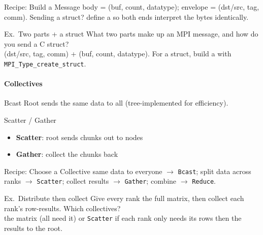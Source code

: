 \multend

\begin{KR}{Recipe: Build a Message}
    body = (buf, count, datatype); envelope = (dst/src, tag, comm). Sending a struct? define a  so both ends interpret the bytes identically.
\end{KR}

\begin{example2}{Ex.\ Two parts + a struct}
    What two parts make up an MPI message, and how do you send a C struct?
     \\ 
     (dst/src, tag, comm) +  (buf, count, datatype). For a struct, build a  with \texttt{MPI\_Type\_create\_struct}.
\end{example2}

\paragraph{Collectives}


\begin{definition}{Bcast}
    Root sends the same data to all (tree-implemented for efficiency).
\end{definition}

\begin{definition}{Scatter / Gather}
    \begin{itemize}
        \item \textbf{Scatter}: root sends chunks out to nodes
        \item \textbf{Gather}: collect the chunks back
    \end{itemize}
\end{definition}

\multend

\begin{KR}{Recipe: Choose a Collective}
    same data to everyone $\to$ \texttt{Bcast}; split data across ranks $\to$ \texttt{Scatter}; collect results $\to$ \texttt{Gather}; combine $\to$ \texttt{Reduce}.
\end{KR}

\begin{example2}{Ex.\ Distribute then collect}
    Give every rank the full matrix, then collect each rank's row-results. Which collectives?
     \\ 
     the matrix (all need it) or \texttt{Scatter} if each rank only needs its rows then  the results to the root.
\end{example2}

